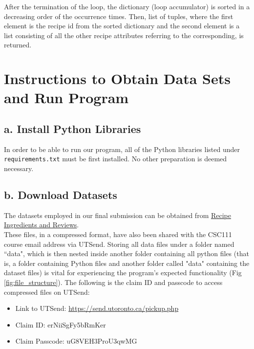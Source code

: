 \documentclass[fontsize=11pt]{article}
\begin{document}
    After the termination of the loop, the dictionary (loop accumulator) is sorted in a decreasing order of the occurrence times. Then, list of tuples, where the first element is the recipe id from the sorted dictionary and the second element is a list consisting of all the other recipe attributes referring to the corresponding, is returned. \\


    \section*{Instructions to Obtain Data Sets and Run Program}

    \subsection*{a. Install Python Libraries}

    In order to be able to run our program, all of the Python libraries listed under \texttt{requirements.txt} must be first installed. No other preparation is deemed necessary.

    \subsection*{b. Download Datasets}

    The datasets employed in our final submission can be obtained from \href{https://www.kaggle.com/kanaryayi/recipe-ingredients-and-reviews}{Recipe Ingredients and Reviews}. \cite{recipe_dataset} \\

    These files, in a compressed format, have also been shared with the CSC111 course email address via UTSend. Storing all data files under a folder named ``data", which is then nested inside another folder containing all python files (that is, a folder containing Python files and another folder called "data" containing the dataset files) is vital for experiencing the program's expected functionality (Fig \ref{fig:file_structure}). The following is the claim ID and passcode to access compressed files on UTSend:

    \begin{itemize}
        \item Link to UTSend: \url{https://send.utoronto.ca/pickup.php}
        \item Claim ID: erNiiSgFy5bRmKer
        \item Claim Passcode: uG8VEH3ProU3qwMG
    \end{itemize}
\end{document}
